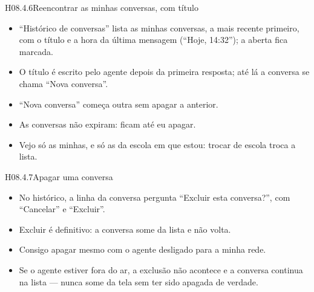 \begin{historia}{H08.4.6}{Reencontrar as minhas conversas, com título}{\parcial}
\aceite
\begin{itemize}
  \item \enquote{Histórico de conversas} lista as minhas conversas, a mais
    recente primeiro, com o título e a hora da última mensagem (\enquote{Hoje,
    14:32}); a aberta fica marcada.
  \item O título é escrito pelo agente depois da primeira resposta; até lá a
    conversa se chama \enquote{Nova conversa}.
  \item \enquote{Nova conversa} começa outra sem apagar a anterior.
  \item As conversas não expiram: ficam até eu apagar.
  \item Vejo só as minhas, e só as da escola em que estou: trocar de escola
    troca a lista.
\end{itemize}
\end{historia}

\begin{historia}{H08.4.7}{Apagar uma conversa}{\parcial}
\aceite
\begin{itemize}
  \item No histórico, a linha da conversa pergunta \enquote{Excluir esta
    conversa?}, com \enquote{Cancelar} e \enquote{Excluir}.
  \item Excluir é definitivo: a conversa some da lista e não volta.
  \item Consigo apagar mesmo com o agente desligado para a minha rede.
  \item Se o agente estiver fora do ar, a exclusão não acontece e a conversa
    continua na lista --- nunca some da tela sem ter sido apagada de verdade.
\end{itemize}
\end{historia}

